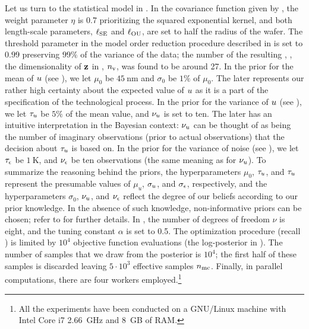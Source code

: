 Let us turn to the statistical model in . In the covariance function given by , the weight parameter $\eta$ is 0.7 prioritizing the squared exponential kernel, and both length-scale parameters, $\ell_{\text{SE}}$ and $\ell_{\text{OU}}$, are set to half the radius of the wafer. The threshold parameter in the model order reduction procedure described in  is set to $0.99$ preserving $99\%$ of the variance of the data; the number of the resulting \rvs, \ie, the dimensionality of $\mathbf{z}$ in , ${n_\text{v}}$, was found to be around 27. In the prior for the mean of $u$ (see ), we let $\mu_0$ be $45~\text{nm}$ and $\sigma_0$ be $1\%$ of $\mu_0$. The later represents our rather high certainty about the expected value of $u$ as it is a part of the specification of the technological process. In the prior for the variance of $u$ (see ), we let $\tau_u$ be $5\%$ of the mean value, and $\nu_u$ is set to ten. The later has an intuitive interpretation in the Bayesian context: $\nu_u$ can be thought of as being the number of imaginary observations (prior to actual observations) that the decision about $\tau_u$ is based on. In the prior for the variance of noise (see ), we let $\tau_\epsilon$ be $1~\text{K}$, and $\nu_\epsilon$ be ten observations (the same meaning as for $\nu_u$). To summarize the reasoning behind the priors, the hyperparameters $\mu_0$, $\tau_u$, and $\tau_u$ represent the presumable values of $\mu_u$, $\sigma_u$, and $\sigma_\epsilon$, respectively, and the hyperparameters $\sigma_0$, $\nu_u$, and $\nu_\epsilon$ reflect the degree of our beliefs according to our prior knowledge. In the absence of such knowledge, non-informative priors can be chosen; refer to \cite{gelman2004} for further details. In , the number of degrees of freedom $\nu$ is eight, and the tuning constant $\alpha$ is set to 0.5. The optimization procedure (recall ) is limited by $10^4$ objective function evaluations (the log-posterior in ). The number of samples that we draw from the posterior is $10^4$; the first half of these samples is discarded leaving $5 \cdot 10^3$ effective samples ${n_\text{mc}}$. Finally, in parallel computations, there are four workers employed.\footnote{All the experiments have been conducted on a GNU/Linux machine with Intel Core i7 2.66~GHz and 8~GB of RAM.}


